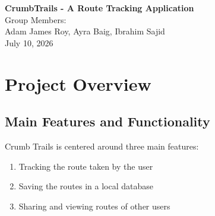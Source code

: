 \documentclass{article}
\begin{document}
    \vspace*{1cm}
    \begin{center}
        {\huge \textbf{CrumbTrails - A Route Tracking Application}} \\
        \vspace{1.5cm}
        {\large Group Members:} \\
        \vspace{0.25cm}
        {\large  Adam James Roy, Ayra Baig, Ibrahim Sajid} \\
        \vspace{1.5cm}
        {\small July 10, 2026}
    \end{center}

    \vspace{1cm}
    \begin{abstract}
        CrumbTrails is an Android application that aims to solve one problem for runners, drivers, motorcyclists,
        and many more: tracking your aimless routes. Whether it is a joyride in a car or trying to find a more 
        interesting running route, CrumbTrails will remember the trail that you have traveled, allowing users to
        look back on their route and place photos along that path automatically. Once having saved a route, these
        are also able to be shared amongst other users in the CrumbTrail community, finding more beautiful scenery,
        tasty pizza joints... Only your imagination is the limit!
    \end{abstract}


    \newpage

    \tableofcontents

    \newpage

    \section{Project Overview}

        \subsection{Main Features and Functionality}

            Crumb Trails is centered around three main features:

            \begin{enumerate}
                \item Tracking the route taken by the user
                \item Saving the routes in a local database
                \item Sharing and viewing routes of other users
            \end{enumerate}
\end{document}
